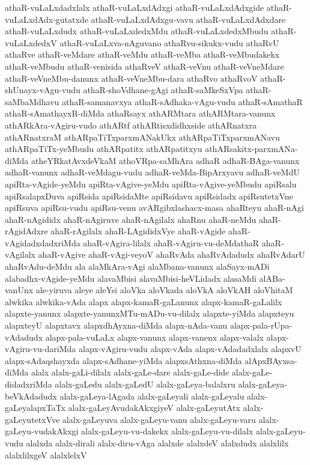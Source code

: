 {athaR-vuLaLxdadxlalx
athaR-vuLaLxdAdxgi
athaR-vuLaLxdAdxgide
athaR-vuLaLxdAdx-gutatxde
athaR-vuLaLxdAdxgu-vavu
athaR-vuLaLxdAdxdare
athaR-vuLaLxdudx
athaR-vuLaLxdedxMdu
athaR-vuLaLxdedxMbudu
athaR-vuLaLxdedxV
athaR-vuLaLxva-nAguvano
athaRvu-sikukx-vudu
athaRvU
athaRve
athaR-veMdare
athaR-veMdu
athaR-veMba
athaR-veMbudakekx
athaR-veMbudu
athaR-venisida
athaRveV
athaR-veVnu
athaR-veVneMdare
athaR-veVneMbu-danunx
athaR-veVneMbu-dara
athaRvo
athaRvoV
athaR-shUnayx-vAgu-vudu
athaR-shoVdhane-gAgi
athaR-saMkeSxVpa
athaR-saMbaMdhavu
athaR-samanavxya
athaR-sAdhaka-vAgu-vudu
athaR-sAmathaR
athaR-sAmathayxR-diMda
athaRsayx
athARMtara
athARMtara-vanunx
athARkAra-vAgiru-vudo
athARtf
athARtisxdidhxside
athARnatxra
athARnatxraM
athARpaTiTxparxmANakUkx
athARpaTiTxparxmANavu
athARpaTiTx-yeMbudu
athARpatitx
athARpatitxyu
athARsakitx-parxmANa-diMda
atheYRkatAvxdeVkaM
athoVRpa-saMhAra
adhaR
adhaR-BAga-vanunx
adhaR-vanunx
adhaR-veMdagu-vudu
adhaR-veMda-BipArxyavu
adhaR-veMdU
apiRta-vAgide-yeMdu
apiRta-vAgive-yeMdu
apiRta-vAgive-yeMbudu
apiRsalu
apiRsalapxDuva
apiRsida
apiRsidaMte
apiRsidavu
apiRsidadx
apiRsutetxVne
apiRsuva
apiRsu-vudu
apiRsu-venu
avARgibxlashacx-masa
ahaRteyu
ahaR-nAgi
ahaR-nAgididx
ahaR-nAgiruve
ahaR-nAgilalx
ahaRnu
ahaR-neMdu
ahaR-rAgidAdxre
ahaR-rAgilalx
ahaR-LAgididxVye
ahaR-vAgide
ahaR-vAgidadxdadxriMda
ahaR-vAgira-lilalx
ahaR-vAgiru-vu-deMdathaR
ahaR-vAgilalx
ahaR-vAgive
ahaR-vAgi-veyoV
ahaRvAda
ahaRvAdadudx
ahaRvAdarU
ahaRvAdu-deMdu
ala
alaMkAra-vAgi
alaMbana-vanunx
alaSayx-mADi
alabadhx-vAgide-yeMdu
alavaMbisi
alavaMbisi-heVLidadx
alasaMdi
alABa-vanUnx
ale-yiruva
aleye
aleYsi
aloVka
aloVkada
aloVkA
aloVkAH
aloVhitaM
alwkika
alwkika-vAda
alapx
alapx-kamaR-gaLanunx
alapx-kamaR-gaLalilx
alapxte-yanunx
alapxte-yanunxMTu-mADu-vu-dilalx
alapxte-yiMda
alapxteyu
alapxteyU
alapxtavx
alapxdhAyxna-diMda
alapx-nAda-vanu
alapx-pala-rUpa-vAdadudx
alapx-pala-vuLaLx
alapx-vanunx
alapx-vanenx
alapx-valalx
alapx-vAgiru-vu-dariMda
alapx-vAgiru-vudu
alapx-vAda
alapx-vAdadadxlalx
alapxvU
alapx-sAdaqshayxda
alapx-sAdhane-yiMda
alapxsAthxna-diMda
alApxBAyxsa-diMda
alalx
alalx-gaLi-dilalx
alalx-gaLe-dare
alalx-gaLe-dide
alalx-gaLe-didadxriMda
alalx-gaLedu
alalx-gaLedU
alalx-gaLeya-balalxru
alalx-gaLeya-beVkAdadudx
alalx-gaLeya-lAgada
alalx-gaLeyali
alalx-gaLeyalu
alalx-gaLeyalapxTaTx
alalx-gaLeyAvudakAkxgiyeV
alalx-gaLeyutAtx
alalx-gaLeyutetxVve
alalx-gaLeyuva
alalx-gaLeyu-vanu
alalx-gaLeyu-varu
alalx-gaLeyu-vudakAkxgi
alalx-gaLeyu-vu-dakekx
alalx-gaLeyu-vu-dilalx
alalx-gaLeyu-vudu
alalxda
alalx-dirali
alalx-diru-vAga
alalxde
alalxdeV
alalxdudx
alalxlilx
alalxlilxgeV
alalxlelxV
}

